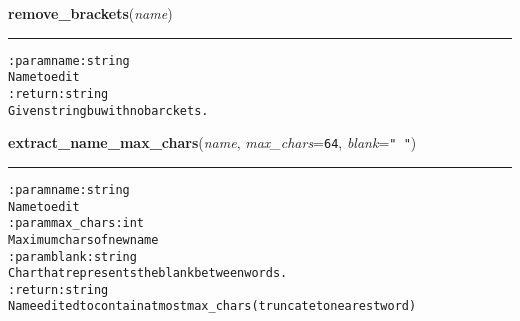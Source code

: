     \vspace{0.5ex}

\hspace{.8\funcindent}\begin{boxedminipage}{\funcwidth}

    \raggedright \textbf{remove\_brackets}(\textit{name})

    \vspace{-1.5ex}

    \rule{\textwidth}{0.5\fboxrule}
\setlength{\parskip}{2ex}
\begin{alltt}

:param name: string
    Name to edit
:return: string
    Given string bu with no barckets.
\end{alltt}

\setlength{\parskip}{1ex}
    \end{boxedminipage}

    \label{hal:files:models:FileSystem:extract_name_max_chars}

    \vspace{0.5ex}

\hspace{.8\funcindent}\begin{boxedminipage}{\funcwidth}

    \raggedright \textbf{extract\_name\_max\_chars}(\textit{name}, \textit{max\_chars}={\tt 64}, \textit{blank}={\tt " "})

    \vspace{-1.5ex}

    \rule{\textwidth}{0.5\fboxrule}
\setlength{\parskip}{2ex}
\begin{alltt}

:param name: string
    Name to edit
:param max\_chars: int
    Maximum chars of new name
:param blank: string
    Char that represents the blank between words.
:return: string
    Name edited to contain at most max\_chars (truncate to nearest word)
\end{alltt}

\setlength{\parskip}{1ex}
    \end{boxedminipage}

    \label{hal:files:models:FileSystem:prettify}

